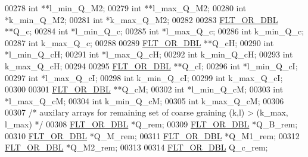 \begin{DoxyCode}
00278       \textcolor{keywordtype}{int}             **l\_min\_Q\_M2;
00279       \textcolor{keywordtype}{int}             **l\_max\_Q\_M2;
00280       \textcolor{keywordtype}{int}             *k\_min\_Q\_M2;
00281       \textcolor{keywordtype}{int}             *k\_max\_Q\_M2;
00282 
00283       \hyperlink{group__data__structures_ga31125aeace516926bf7f251f759b6126}{FLT\_OR\_DBL}      **Q\_c;
00284       \textcolor{keywordtype}{int}             *l\_min\_Q\_c;
00285       \textcolor{keywordtype}{int}             *l\_max\_Q\_c;
00286       \textcolor{keywordtype}{int}             k\_min\_Q\_c;
00287       \textcolor{keywordtype}{int}             k\_max\_Q\_c;
00288 
00289       \hyperlink{group__data__structures_ga31125aeace516926bf7f251f759b6126}{FLT\_OR\_DBL}      **Q\_cH;
00290       \textcolor{keywordtype}{int}             *l\_min\_Q\_cH;
00291       \textcolor{keywordtype}{int}             *l\_max\_Q\_cH;
00292       \textcolor{keywordtype}{int}             k\_min\_Q\_cH;
00293       \textcolor{keywordtype}{int}             k\_max\_Q\_cH;
00294 
00295       \hyperlink{group__data__structures_ga31125aeace516926bf7f251f759b6126}{FLT\_OR\_DBL}      **Q\_cI;
00296       \textcolor{keywordtype}{int}             *l\_min\_Q\_cI;
00297       \textcolor{keywordtype}{int}             *l\_max\_Q\_cI;
00298       \textcolor{keywordtype}{int}             k\_min\_Q\_cI;
00299       \textcolor{keywordtype}{int}             k\_max\_Q\_cI;
00300 
00301       \hyperlink{group__data__structures_ga31125aeace516926bf7f251f759b6126}{FLT\_OR\_DBL}      **Q\_cM;
00302       \textcolor{keywordtype}{int}             *l\_min\_Q\_cM;
00303       \textcolor{keywordtype}{int}             *l\_max\_Q\_cM;
00304       \textcolor{keywordtype}{int}             k\_min\_Q\_cM;
00305       \textcolor{keywordtype}{int}             k\_max\_Q\_cM;
00306 
00307       \textcolor{comment}{/* auxilary arrays for remaining set of coarse graining (k,l) > (k\_max, l\_max) */}
00308       \hyperlink{group__data__structures_ga31125aeace516926bf7f251f759b6126}{FLT\_OR\_DBL}      *Q\_rem;
00309       \hyperlink{group__data__structures_ga31125aeace516926bf7f251f759b6126}{FLT\_OR\_DBL}      *Q\_B\_rem;
00310       \hyperlink{group__data__structures_ga31125aeace516926bf7f251f759b6126}{FLT\_OR\_DBL}      *Q\_M\_rem;
00311       \hyperlink{group__data__structures_ga31125aeace516926bf7f251f759b6126}{FLT\_OR\_DBL}      *Q\_M1\_rem;
00312       \hyperlink{group__data__structures_ga31125aeace516926bf7f251f759b6126}{FLT\_OR\_DBL}      *Q\_M2\_rem;
00313 
00314       \hyperlink{group__data__structures_ga31125aeace516926bf7f251f759b6126}{FLT\_OR\_DBL}      Q\_c\_rem;

\end{DoxyCode}
